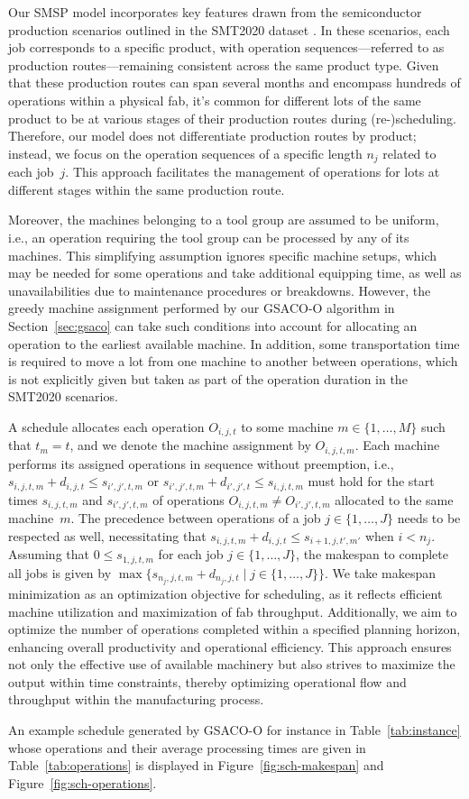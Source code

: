 Our SMSP model incorporates key features drawn from the semiconductor production 
scenarios outlined in the SMT2020 dataset \cite{kopp2020smt2020}. 
In these scenarios, each job corresponds to a specific product, 
with operation sequences—referred to as production routes—remaining 
consistent across the same product type. Given that these production routes 
can span several months and encompass hundreds of operations within a physical fab, 
it's common for different lots of the same product to be at various stages 
of their production routes during (re-)scheduling. 
Therefore, our model does not differentiate production routes by product; 
instead, we focus on the operation sequences of a specific length $n_j$ related to each job~$j$. 
This approach facilitates the management of operations for lots at different stages within the same production route.

Moreover, the machines belonging to a tool group are assumed to be uniform,
i.e., an operation requiring the tool group can be processed by any of its
machines.
This simplifying assumption ignores specific machine setups, which may be
needed for some operations and take additional equipping time,
as well as unavailabilities due to maintenance procedures or breakdowns.
However, the greedy machine assignment performed by our GSACO-O algorithm
in Section~\ref{sec:gsaco} can take such conditions into account for
allocating an operation to the earliest available machine.
In addition, some transportation time is required to move
a lot from one machine to another between operations,
which is not explicitly given but taken as part of the operation duration
in the SMT2020 scenarios.

A schedule allocates each operation $O_{i,j,t}$ to some machine
$m\in\{1,\dots,M\}$ such that $t_m=t$, and we denote the machine
assignment by $O_{i,j,t,m}$.
Each machine performs its assigned operations in sequence without
preemption, i.e.,
$s_{i,j,t,m} + d_{i,j,t} \leq s_{i',j',t,m}$ or
$s_{i',j',t,m} + d_{i',j',t} \leq s_{i,j,t,m}$
must hold for the start times
$s_{i,j,t,m}$ and $s_{i',j',t,m}$ of operations
$O_{i,j,t,m}\neq O_{i',j',t,m}$
allocated to the same machine~$m$.
The precedence between operations of a job $j\in\{1,\dots,J\}$ needs to be
respected as well, necessitating that
$s_{i,j,t,m} + d_{i,j,t} \leq s_{i+1,j,t',m'}$ when $i<n_j$.
Assuming that $0\leq s_{1,j,t,m}$ for each job $j\in\{1,\dots,J\}$,
the makespan to complete all jobs is given by
$\max\{s_{n_j,j,t,m} + d_{n_j,j,t} \mid j\in\{1,\dots,J\}\}$.
We take makespan minimization as an optimization objective for scheduling, as it reflects efficient machine utilization and maximization of fab throughput. Additionally, we aim to optimize the number of operations completed within a specified planning horizon, enhancing overall productivity and operational efficiency. This approach ensures not only the effective use of available machinery but also strives to maximize the output within time constraints, thereby optimizing operational flow and throughput within the manufacturing process.

An example schedule generated by GSACO-O for instance in Table~\ref{tab:instance} whose operations and their average processing times are given in Table~\ref{tab:operations} is displayed in Figure~\ref{fig:sch-makespan} and Figure~\ref{fig:sch-operations}.